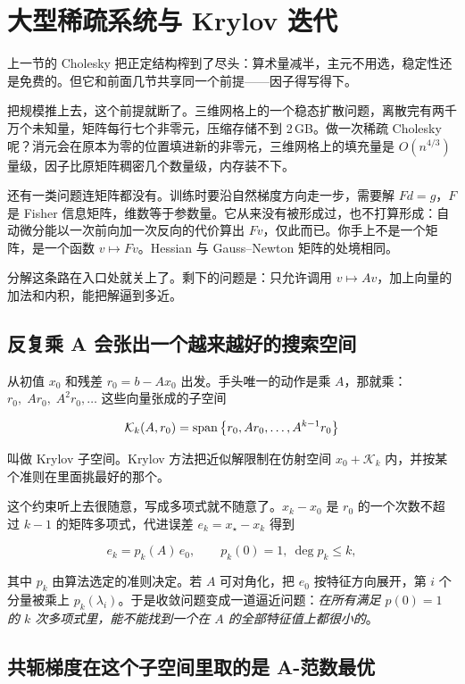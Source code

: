 \section{大型稀疏系统与 Krylov 迭代}
\label{sec:08-Numerical-Analysis/05-Numerical-Linear-Algebra/04}

上一节的 Cholesky 把正定结构榨到了尽头：算术量减半，主元不用选，稳定性还是免费的。但它和前面几节共享同一个前提——因子得写得下。

把规模推上去，这个前提就断了。三维网格上的一个稳态扩散问题，离散完有两千万个未知量，矩阵每行七个非零元，压缩存储不到 2\,GB。做一次稀疏 Cholesky 呢？消元会在原本为零的位置填进新的非零元，三维网格上的填充量是 \(O(n^{4/3})\) 量级，因子比原矩阵稠密几个数量级，内存装不下。

还有一类问题连矩阵都没有。训练时要沿自然梯度方向走一步，需要解 \(Fd=g\)，\(F\) 是 Fisher 信息矩阵，维数等于参数量。它从来没有被形成过，也不打算形成：自动微分能以一次前向加一次反向的代价算出 \(Fv\)，仅此而已。你手上不是一个矩阵，是一个函数 \(v\mapsto Fv\)。Hessian 与 Gauss--Newton 矩阵的处境相同。

分解这条路在入口处就关上了。剩下的问题是：只允许调用 \(v\mapsto Av\)，加上向量的加法和内积，能把解逼到多近。

\subsection{反复乘 A 会张出一个越来越好的搜索空间}

从初值 \(x_0\) 和残差 \(r_0=b-Ax_0\) 出发。手头唯一的动作是乘 \(A\)，那就乘：\(r_0,\;Ar_0,\;A^2r_0,\ldots\) 这些向量张成的子空间

\[
\mathcal K_k(A,r_0)=\operatorname{span}\left\{r_0,Ar_0,\ldots,A^{k-1}r_0\right\}
\]

叫做 Krylov 子空间。Krylov 方法把近似解限制在仿射空间 \(x_0+\mathcal K_k\) 内，并按某个准则在里面挑最好的那个。

这个约束听上去很随意，写成多项式就不随意了。\(x_k-x_0\) 是 \(r_0\) 的一个次数不超过 \(k-1\) 的矩阵多项式，代进误差 \(e_k=x_\star-x_k\) 得到

\[
e_k=p_k(A)\,e_0,\qquad p_k(0)=1,\ \deg p_k\le k,
\]

其中 \(p_k\) 由算法选定的准则决定。若 \(A\) 可对角化，把 \(e_0\) 按特征方向展开，第 \(i\) 个分量被乘上 \(p_k(\lambda_i)\)。于是收敛问题变成一道逼近问题：\emph{在所有满足 \(p(0)=1\) 的 \(k\) 次多项式里，能不能找到一个在 \(A\) 的全部特征值上都很小的}。

\subsection{共轭梯度在这个子空间里取的是 A-范数最优}

